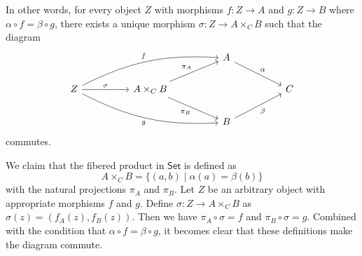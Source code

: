 \documentclass[../../master.tex]{subfiles}
\begin{document}
\begin{solution}
      In other words, for every object \(Z\) with morphisms \(f: Z \to A\) and  \(g: Z \to B\) where \(\alpha \circ f = \beta \circ g\),
      there exists a unique morphism \(\sigma: Z \to A \times_{C} B\) such that the diagram
      \[
      \begin{tikzcd}
        &&&& {A} \\
        {Z} && {A \times_{C} B} &&&& {C} \\
        &&&& {B}
        \arrow["{\alpha}", from=1-5, to=2-7]
        \arrow["{\beta}"', from=3-5, to=2-7]
        \arrow["{f}", from=2-1, to=1-5, bend left=15]
        \arrow["{g}"', from=2-1, to=3-5, bend right=15]
        \arrow["{\pi_{A}}", from=2-3, to=1-5]
        \arrow["{\pi_{B}}"', from=2-3, to=3-5]
        \arrow["{\sigma}", from=2-1, to=2-3]
      \end{tikzcd}
      \]
      commutes.

      We claim that the fibered product in \(\mathsf{Set}\) is defined as
      \begin{equation*}
        A \times_{C} B = \{(a, b) \mid \alpha(a) = \beta(b)\}
      \end{equation*}
      with the natural projections \(\pi_{A}\) and \(\pi_{B}\).
      Let \(Z\) be an arbitrary object with appropriate morphisms \(f\) and \(g\).
      Define \(\sigma: Z \to A \times_{C} B\) as \(\sigma(z) = (f_{A}(z), f_{B}(z))\).
      Then we have \(\pi_{A} \circ \sigma = f\) and \(\pi_{B} \circ \sigma = g\).
      Combined with the condition that \(\alpha \circ f = \beta \circ g\),
      it becomes clear that these definitions make the diagram commute.


\end{solution}
\end{document}
